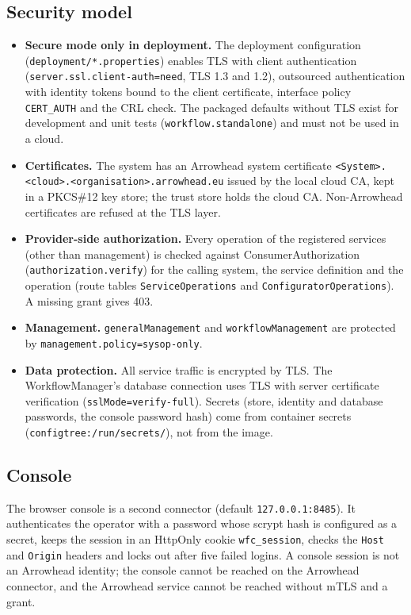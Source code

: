 \documentclass[a4paper]{arrowhead}
\begin{document}
\subsection{Security model}
\begin{itemize}
\item \textbf{Secure mode only in deployment.} The deployment configuration (\texttt{deployment/*.properties}) enables
TLS with client authentication (\texttt{server.ssl.client-auth=need}, TLS 1.3 and 1.2), outsourced authentication with
identity tokens bound to the client certificate, interface policy \texttt{CERT\_AUTH} and the CRL check. The packaged
defaults without TLS exist for development and unit tests (\texttt{workflow.standalone}) and must not be used in a
cloud.
\item \textbf{Certificates.} The system has an Arrowhead system certificate
\texttt{<System>.<cloud>.<organisation>.arrowhead.eu} issued by the local cloud CA, kept in a PKCS\#12 key store; the
trust store holds the cloud CA. Non-Arrowhead certificates are refused at the TLS layer.
\item \textbf{Provider-side authorization.} Every operation of the registered services (other than management) is
checked against ConsumerAuthorization (\texttt{authorization.verify}) for the calling system, the service definition
and the operation (route tables \texttt{ServiceOperations} and \texttt{ConfiguratorOperations}). A missing grant gives
403.
\item \textbf{Management.} \texttt{generalManagement} and \texttt{workflowManagement} are protected by
\texttt{management.policy=sysop-only}.
\item \textbf{Data protection.} All service traffic is encrypted by TLS. The WorkflowManager's database connection uses
TLS with server certificate verification (\texttt{sslMode=verify-full}). Secrets (store, identity and database
passwords, the console password hash) come from container secrets (\texttt{configtree:/run/secrets/}), not from the
image.
\end{itemize}


\subsection{Console}
The browser console is a second connector (default \texttt{127.0.0.1:8485}). It authenticates the operator with a
password whose scrypt hash is configured as a secret, keeps the session in an HttpOnly cookie \texttt{wfc\_session},
checks the \texttt{Host} and \texttt{Origin} headers and locks out after five failed logins. A console session is not
an Arrowhead identity; the console cannot be reached on the Arrowhead connector, and the Arrowhead service cannot be
reached without mTLS and a grant.
\end{document}
